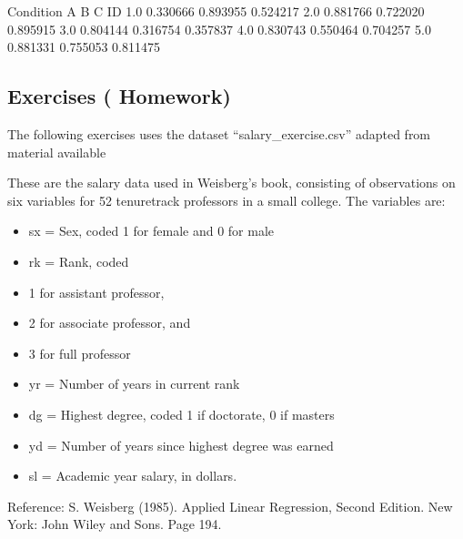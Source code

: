 \documentclass[letterpaper,10pt,english]{sphinxmanual}
\begin{document}
\begin{sphinxVerbatim}[commandchars=\\\{\}]
Condition         A         B         C
ID                                     
1.0        0.330666  0.893955  0.524217
2.0        0.881766  0.722020  0.895915
3.0        0.804144  0.316754  0.357837
4.0        0.830743  0.550464  0.704257
5.0        0.881331  0.755053  0.811475
\end{sphinxVerbatim}


\subsection{Exercises ( Homework)}
\label{\detokenize{content/Introduction_to_Pandas:exercises-homework}}
The following exercises uses the dataset “salary\_exercise.csv” adapted from material available 

These are the salary data used in Weisberg’s book, consisting of observations on six variables for 52 tenure\sphinxhyphen{}track professors in a small college. The variables are:
\begin{itemize}
\item {} 
sx = Sex, coded 1 for female and 0 for male

\item {} 
rk = Rank, coded

\item {} 
1 for assistant professor,

\item {} 
2 for associate professor, and

\item {} 
3 for full professor

\item {} 
yr = Number of years in current rank

\item {} 
dg = Highest degree, coded 1 if doctorate, 0 if masters

\item {} 
yd = Number of years since highest degree was earned

\item {} 
sl = Academic year salary, in dollars.

\end{itemize}

Reference: S. Weisberg (1985). Applied Linear Regression, Second Edition. New York: John Wiley and Sons. Page 194.
\end{document}
